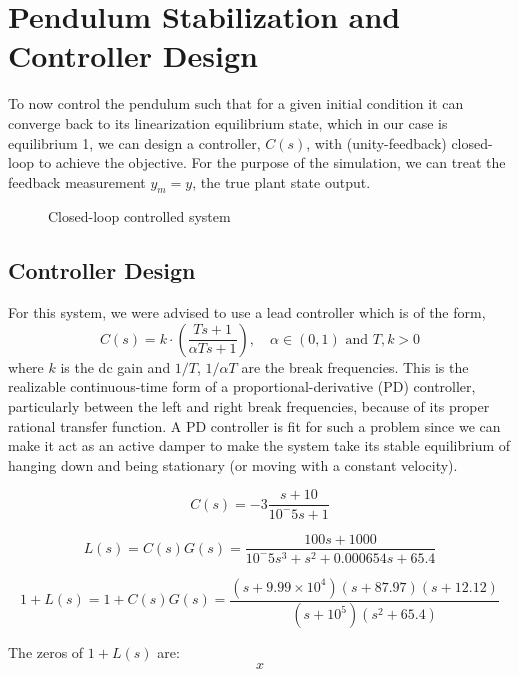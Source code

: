 \documentclass[10pt]{article}
\begin{document}
\section{Pendulum Stabilization and Controller Design}
To now control the pendulum such that for a given initial condition it can converge back to its linearization equilibrium state, which in our case is equilibrium 1, we can design a controller, $C(s)$, with (unity-feedback) closed-loop to achieve the objective. For the purpose of the simulation, we can treat the feedback measurement $y_m = y$, the true plant state output.

\begin{figure}[!h]
    \centering
    \mixedcls
    \caption{Closed-loop controlled system}
\end{figure}

\subsection{Controller Design}
For this system, we were advised to use a lead controller which is of the form, 
\[ C(s) = k\cdot\left(\frac{Ts + 1}{\alpha Ts + 1}\right), \quad \alpha \in (0,1) \text{ and } T,k > 0\]
where $k$ is the dc gain and $1/T$, $1/\alpha T$ are the break frequencies. This is the realizable continuous-time form of a proportional-derivative (PD) controller, particularly between the left and right break frequencies, because of its proper rational transfer function. A PD controller is fit for such a problem since we can make it act as an active damper to make the system take its stable equilibrium of hanging down and being stationary (or moving with a constant velocity).

\begin{equation*}
    C(s) = -3\frac{s+10}{10^-5s+1}
\end{equation*}

\begin{equation*}
L(s) = C(s)G(s) = \frac{100s + 1000}{10^-5s^3+s^2+0.000654s+65.4}
\end{equation*}

\begin{equation*}
    1+L(s) = 1 + C(s)G(s) = \frac{(s + 9.99 \times 10^4)(s+87.97)(s+12.12)}{(s+10^5)(s^2+65.4)}
\end{equation*}

The zeros of $1+L(s)$ are:
\begin{equation*}
    x
\end{equation*}
\end{document}
